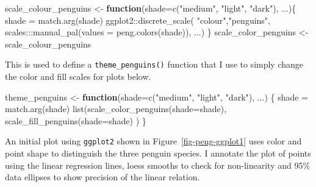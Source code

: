 \documentclass[
  letterpaper,
  10pt,
  krantz2]{krantz}
\makeatletter
\newenvironment{Shaded}{\begin{snugshade}}{\end{snugshade}}
\newcommand{\AttributeTok}[1]{\textcolor[rgb]{0.40,0.45,0.13}{#1}}
\newcommand{\ControlFlowTok}[1]{\textcolor[rgb]{0.00,0.23,0.31}{\textbf{#1}}}
\newcommand{\FunctionTok}[1]{\textcolor[rgb]{0.28,0.35,0.67}{#1}}
\newcommand{\NormalTok}[1]{\textcolor[rgb]{0.00,0.23,0.31}{#1}}
\newcommand{\OtherTok}[1]{\textcolor[rgb]{0.00,0.23,0.31}{#1}}
\newcommand{\SpecialCharTok}[1]{\textcolor[rgb]{0.37,0.37,0.37}{#1}}
\newcommand{\StringTok}[1]{\textcolor[rgb]{0.13,0.47,0.30}{#1}}
\newenvironment{kframe}{%
  \medskip{}
  \setlength{\fboxsep}{.8em}
  \def\at@end@of@kframe{}%
  \ifinner\ifhmode%
  \def\at@end@of@kframe{\end{minipage}}%
  \begin{minipage}{\columnwidth}%
  \fi\fi%
  \def\FrameCommand##1{\hskip\@totalleftmargin \hskip-\fboxsep
  \colorbox{shadecolor}{##1}\hskip-\fboxsep
      \hskip-\linewidth \hskip-\@totalleftmargin \hskip\columnwidth}%
  \MakeFramed {\advance\hsize-\width
    \@totalleftmargin\z@ \linewidth\hsize
    \@setminipage}}%
{\par\unskip\endMakeFramed%
  \at@end@of@kframe}
\renewenvironment{Shaded}{\begin{kframe}}{\end{kframe}}
\makeatother
\begin{document}
\begin{Shaded}
\begin{Highlighting}[]
\NormalTok{scale\_colour\_penguins }\OtherTok{\textless{}{-}} \ControlFlowTok{function}\NormalTok{(}\AttributeTok{shade=}\FunctionTok{c}\NormalTok{(}\StringTok{"medium"}\NormalTok{, }\StringTok{"light"}\NormalTok{, }\StringTok{"dark"}\NormalTok{), ...)\{}
\NormalTok{  shade }\OtherTok{=} \FunctionTok{match.arg}\NormalTok{(shade)}
\NormalTok{  ggplot2}\SpecialCharTok{::}\FunctionTok{discrete\_scale}\NormalTok{(}
    \StringTok{"colour"}\NormalTok{,}\StringTok{"penguins"}\NormalTok{,}
\NormalTok{    scales}\SpecialCharTok{:::}\FunctionTok{manual\_pal}\NormalTok{(}\AttributeTok{values =} \FunctionTok{peng.colors}\NormalTok{(shade)), ...)}
\NormalTok{\}}
\NormalTok{scale\_color\_penguins }\OtherTok{\textless{}{-}}\NormalTok{ scale\_colour\_penguins}
\end{Highlighting}
\end{Shaded}

This is used to define a \texttt{theme\_penguins()} function that I use
to simply change the color and fill scales for plots below.

\begin{Shaded}
\begin{Highlighting}[]
\NormalTok{theme\_penguins }\OtherTok{\textless{}{-}} \ControlFlowTok{function}\NormalTok{(}\AttributeTok{shade=}\FunctionTok{c}\NormalTok{(}\StringTok{"medium"}\NormalTok{, }\StringTok{"light"}\NormalTok{, }\StringTok{"dark"}\NormalTok{), ...) \{}
\NormalTok{  shade }\OtherTok{=} \FunctionTok{match.arg}\NormalTok{(shade)}
  \FunctionTok{list}\NormalTok{(}\FunctionTok{scale\_color\_penguins}\NormalTok{(}\AttributeTok{shade=}\NormalTok{shade),}
       \FunctionTok{scale\_fill\_penguins}\NormalTok{(}\AttributeTok{shade=}\NormalTok{shade)}
\NormalTok{      )}
\NormalTok{\}}
\end{Highlighting}
\end{Shaded}

An initial plot using \texttt{ggplot2} shown in
Figure~\ref{fig-peng-ggplot1} uses color and point shape to distinguish
the three penguin species. I annotate the plot of points using the
linear regression lines, loess smooths to check for non-linearity and
95\% data ellipses to show precision of the linear relation.
\end{document}
